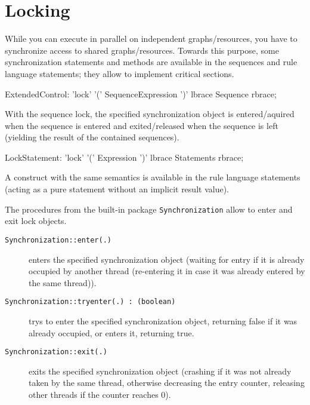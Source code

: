 \section{Locking}\label{locking}

While you can execute in parallel on independent graphs/resources, you have to synchronize access to shared graphs/resources.
Towards this purpose, some synchronization statements and methods are available in the sequences and rule language statements; they allow to implement critical sections.

\begin{rail}
  ExtendedControl: 'lock' '(' SequenceExpression ')' lbrace Sequence rbrace;
\end{rail}

With the sequence lock, the specified synchronization object is entered/aquired when the sequence is entered and exited/released when the sequence is left (yielding the result of the contained sequences).

\begin{rail}
  LockStatement: 'lock' '(' Expression ')' lbrace Statements rbrace;
\end{rail}

A construct with the same semantics is available in the rule language statements (acting as a pure statement without an implicit result value).

The procedures from the built-in package \texttt{Synchronization} allow to enter and exit lock objects.

\begin{description}
\item[\texttt{Synchronization::enter(.)}] enters the specified synchronization object (waiting for entry if it is already occupied by another thread (re-entering it in case it was already entered by the same thread)).
\item[\texttt{Synchronization::tryenter(.) : (boolean)}] trys to enter the specified synchronization object, returning false if it was already occupied, or enters it, returning true.
\item[\texttt{Synchronization::exit(.)}] exits the specified synchronization object (crashing if it was not already taken by the same thread, otherwise decreasing the entry counter, releasing other threads if the counter reaches 0).
\end{description}
   
